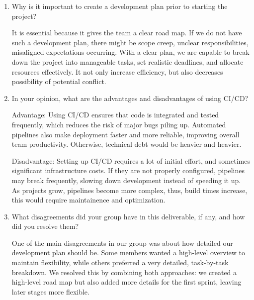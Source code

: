 \documentclass{article}
\begin{document}

 

\begin{enumerate}
    \item Why is it important to create a development plan prior to starting the
    project?

    It is essential because it gives the team a clear road map. If we do not have such a development plan, there might be scope creep, unclear responsibilities, misaligned expectations occurring. With a clear plan, we are capable to break down the project into manageable tasks, set realistic deadlines, and allocate resources effectively. It not only increase efficiency, but also decreases possibility of potential conflict.
    \item In your opinion, what are the advantages and disadvantages of using
    CI/CD?

    Advantage: Using CI/CD ensures that code is integrated and tested frequently, which reduces the risk of major bugs piling up. Automated pipelines also make deployment faster and more reliable, improving overall team productivity. Otherwise, technical debt would be heavier and heavier.

    Disadvantage: Setting up CI/CD requires a lot of initial effort, and sometimes significant infrastructure costs. If they are not properly configured, pipelines may break frequently, slowing down development instead of speeding it up. As projects grow, pipelines become more complex, thus, build times increase, this would require maintainence and optimization.
    \item What disagreements did your group have in this deliverable, if any,
    and how did you resolve them?

    One of the main disagreements in our group was about how detailed our development plan should be. Some members wanted a high-level overview to maintain flexibility, while others preferred a very detailed, task-by-task breakdown. We resolved this by combining both approaches: we created a high-level road map but also added more details for the first sprint, leaving later stages more flexible.

\end{enumerate}
\end{document}
